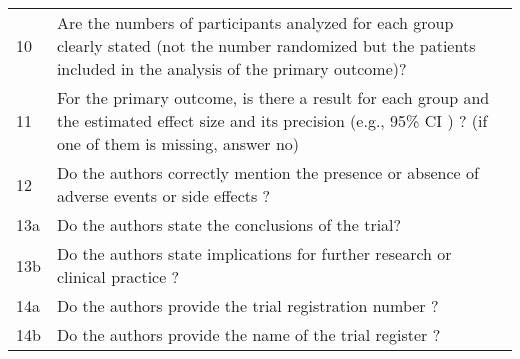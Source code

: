 \begin{table}[!ht]
\begin{tabular}{ll}
10 & Are the numbers of participants analyzed for each group clearly stated (not the number randomized but the patients included in the analysis of the primary outcome)? \\
11 & For the primary outcome, is there a result for each group and the estimated effect size and its precision (e.g., 95\% CI ) ? (if one of them is missing, answer no) \\
12 & Do the authors correctly mention the presence or absence of adverse events or side effects ? \\
13a & Do the authors state the conclusions of the trial? \\
13b & Do the authors state implications for further research or clinical practice ? \\
14a & Do the authors provide the trial registration number ? \\
14b & Do the authors provide the name of the trial register ? \\
\bottomrule
\end{tabular}
\end{table}

